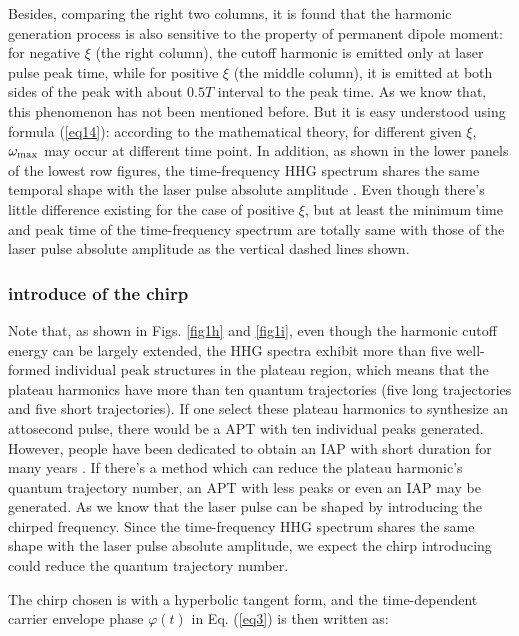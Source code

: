 \documentclass[10pt,letterpaper]{article}
\begin{document}
\begin{figure}[h]
	\label{fig1}
\end{figure} 

Besides, comparing the right two columns, it is found that the harmonic generation process is also sensitive to the property of permanent dipole moment: for negative $\xi$ (the right column), the cutoff harmonic is emitted only at laser pulse peak time, while for positive $\xi$ (the middle column), it is emitted at both sides of the peak with about $0.5T$ interval to the peak time. As we know that, this phenomenon has not been mentioned before. But it is easy understood using formula (\ref{eq14}): according to the mathematical theory, for different given $\xi$, $\omega_{\rm{max}}$ may occur at different time point. In addition, as shown in the lower panels of the lowest row figures, the time-frequency HHG spectrum shares the same temporal shape with the laser pulse absolute amplitude \cite{CuiNi2010NJP-wavelet}. Even though there's little difference existing for the case of positive $\xi$, but at least the minimum time and peak time of the time-frequency spectrum are totally same with those of the laser pulse absolute amplitude as the vertical dashed lines shown. 
    
\subsubsection{introduce of the chirp}
Note that, as shown in Figs. \ref{fig1h} and \ref{fig1i}, even though the harmonic cutoff energy can be largely extended, the HHG spectra exhibit more than five well-formed individual peak structures in the plateau region, which means that the plateau harmonics have more than ten quantum trajectories (five long trajectories and five short trajectories). If one select these plateau harmonics to synthesize an attosecond pulse, there would be a APT with ten individual peaks generated. However, people have been dedicated to obtain an IAP with short duration for many years \cite{IAP-reference1-1998,Sansone-Polarization-gate-Nature-2006,IAP-reference2-2008,IAP-reference3-2008,IAP-reference4-2012}. If there's a method which can reduce the plateau harmonic's quantum trajectory number, an APT with less peaks or even an IAP may be generated. As we know that the laser pulse can be shaped by introducing the chirped frequency. Since the time-frequency HHG spectrum shares the same shape with the laser pulse absolute amplitude, we expect the chirp introducing could reduce the quantum trajectory number. 

The chirp chosen is with a hyperbolic tangent form, and the time-dependent carrier envelope phase $ \varphi(t) $ in Eq. (\ref{eq3}) is then written as:
\end{document}
